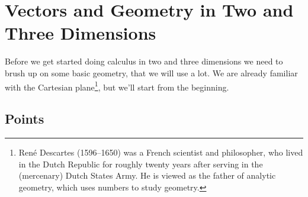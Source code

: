 

\graphicspath{{figures/geometry/}}
\chapter{Vectors and Geometry in Two and Three Dimensions}\label{chap geometry}

Before we get started doing calculus in two and three dimensions 
we need to brush up on some basic geometry, that we will use a lot. 
We are already familiar with the Cartesian plane\footnote{Ren\'e Descartes
(1596--1650) was a French scientist and philosopher, who lived in the Dutch Republic for roughly twenty years after serving in the (mercenary) Dutch States Army.
He is viewed as the father of analytic geometry, which uses numbers
to study geometry.},  but we'll start from the beginning.

\section{Points}\label{sec points}

